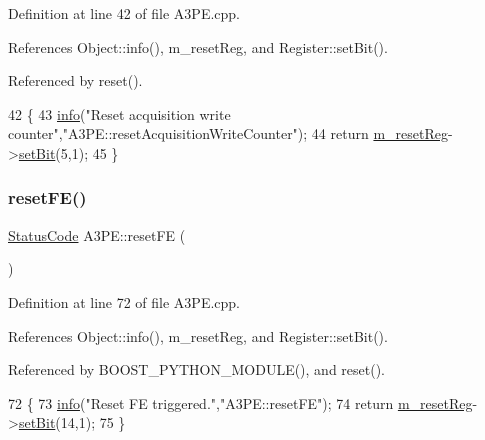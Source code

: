 Definition at line 42 of file A3\+P\+E.\+cpp.



References Object\+::info(), m\+\_\+reset\+Reg, and Register\+::set\+Bit().



Referenced by reset().


\begin{DoxyCode}
42                                              \{
43   \hyperlink{classObject_a644fd329ea4cb85f54fa6846484b84a8}{info}(\textcolor{stringliteral}{"Reset acquisition write counter"},\textcolor{stringliteral}{"A3PE::resetAcquisitionWriteCounter"});
44   \textcolor{keywordflow}{return} \hyperlink{classA3PE_ab4db5f00976e5095686f108c8febf702}{m\_resetReg}->\hyperlink{classRegister_ab094246dd12aa7e0aa0ca917f4e70b31}{setBit}(5,1);
45 \}
\end{DoxyCode}
\mbox{\label{classA3PE_a2cfdb2f37d3d786cbe1ff42fef37b276}} 
\subsubsection{\texorpdfstring{reset\+F\+E()}{resetFE()}}
{\footnotesize\ttfamily \hyperlink{classStatusCode}{Status\+Code} A3\+P\+E\+::reset\+FE (\begin{DoxyParamCaption}{ }\end{DoxyParamCaption})}



Definition at line 72 of file A3\+P\+E.\+cpp.



References Object\+::info(), m\+\_\+reset\+Reg, and Register\+::set\+Bit().



Referenced by B\+O\+O\+S\+T\+\_\+\+P\+Y\+T\+H\+O\+N\+\_\+\+M\+O\+D\+U\+L\+E(), and reset().


\begin{DoxyCode}
72                         \{
73   \hyperlink{classObject_a644fd329ea4cb85f54fa6846484b84a8}{info}(\textcolor{stringliteral}{"Reset FE triggered."},\textcolor{stringliteral}{"A3PE::resetFE"});
74   \textcolor{keywordflow}{return} \hyperlink{classA3PE_ab4db5f00976e5095686f108c8febf702}{m\_resetReg}->\hyperlink{classRegister_ab094246dd12aa7e0aa0ca917f4e70b31}{setBit}(14,1);
75 \}
\end{DoxyCode}
\mbox{\label{classA3PE_aa10639563d06c0d09f3c0725710ff35d}} 
